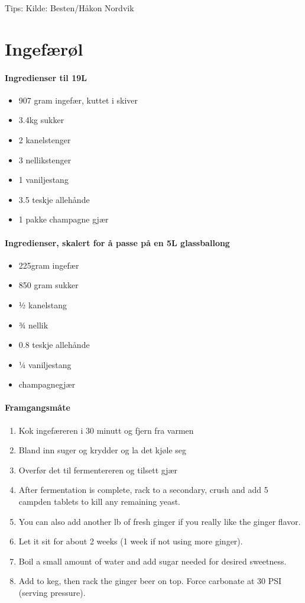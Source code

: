 \documentclass[12pt,a4paper]{book}
\begin{document}
Tips:
Kilde: Besten/Håkon Nordvik
\clearpage{}
\clearpage{}\section{﻿Ingefærøl}


\paragraph{Ingredienser til 19L}
\begin{itemize}[noitemsep]
	\item 907 gram ingefær, kuttet i skiver
	\item 3.4kg sukker
	\item 2 kanelstenger
	\item 3 nellikstenger
	\item 1 vaniljestang
	\item 3.5 teskje allehånde
	\item 1 pakke champagne gjær
\end{itemize}

\paragraph{Ingredienser, skalert for å passe på en 5L glassballong}
\begin{itemize}[noitemsep]
	\item 225gram ingefær
	\item 850 gram sukker
	\item ½ kanelstang
	\item ¾ nellik
	\item 0.8 teskje allehånde
	\item ¼ vaniljestang
	\item champagnegjær
\end{itemize}

\paragraph{Framgangsmåte}
\begin{enumerate}[noitemsep]
	\item Kok ingefæreren i 30 minutt og fjern fra varmen
	\item Bland inn suger og krydder og la det kjøle seg
	\item Overfør det til fermentereren og tilsett gjær

	\item After fermentation is complete, rack to a secondary, crush and add 5 campden tablets to kill any remaining yeast.
	\item You can also add another lb of fresh ginger if you really like the ginger flavor.
	\item Let it sit for about 2 weeks (1 week if not using more ginger).
	\item Boil a small amount of water and add sugar needed for desired sweetness.
	\item Add to keg, then rack the ginger beer on top. Force carbonate at 30 PSI (serving pressure).
\end{enumerate}
\end{document}
